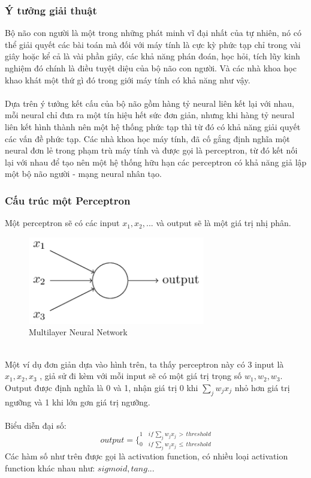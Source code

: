 \subsubsection{Ý tưởng giải thuật}
Bộ não con người là một trong những phát minh vĩ đại nhất của tự nhiên, nó 
có thể giải quyết các bài toán mà đối với máy tính là cực kỳ phức tạp chỉ trong 
vài giây hoặc kể cả là vài phần giây, các khả năng phán đoán, học hỏi, tích lũy 
kinh nghiệm đó chính là điều tuyệt diệu của bộ não con người. Và các nhà khoa học 
khao khát một thứ gì đó trong giới máy tính có khả năng như vậy.\\\\
Dựa trên ý tưởng kết cấu của bộ não gồm hàng tỷ neural liên kết lại với nhau, 
mỗi neural chỉ đưa ra một tín hiệu hết sức đơn giản, nhưng khi hàng tỷ neural liên kết 
hình thành nên một hệ thống phức tạp thì từ đó có khả năng giải quyết các vấn đề 
phức tạp. Các nhà khoa học máy tính, đã cố gắng định nghĩa một neural đơn lẻ 
trong phạm trù máy tính và được gọi là perceptron, từ đó kết nối lại với nhau 
để tạo nên một hệ thống hữu hạn các perceptron có khả năng giả lập một bộ não 
người - mạng neural nhân tạo.

\subsubsection{Cấu trúc một Perceptron}
Một perceptron sẽ có các input $x_1, x_2, ...$ và output sẽ là một giá trị 
nhị phân.\\
\begin{figure}[h!]
\centering
\includegraphics[height=1.5in, keepaspectratio=true]{perceptron.png}
\caption{Multilayer Neural Network}
\end{figure}\\
Một ví dụ đơn giản dựa vào hình trên, ta thấy perceptron này có 3 input là 
$x_1, x_2, x_3$ , giả sử đi kèm với mỗi input sẽ có một giá trị trọng 
số $w_1, w_2, w_3$. Output được định nghĩa là 0 và 1, nhận giá trị 0 
khi $\sum_j w_j x_j$ nhỏ hơn giá trị ngưỡng và 1 khi lớn gơn giá trị ngưỡng.\\\\
Biểu diễn đại số:\\
\[
  output = 
  \bigg\{
    _{0 \quad if \, \sum_j w_j x_j \, \leq \, threshold}
    ^{1 \quad if \, \sum_j w_j x_j \, > \, threshold}
\]
Các hàm số như trên được gọi là activation function, có nhiều loại activation
 function khác nhau như: $sigmoid , tang ...$ 

